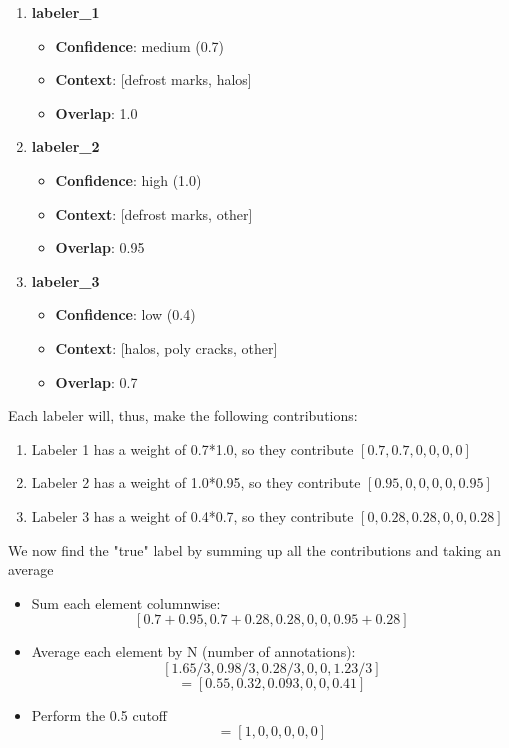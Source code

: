 \documentclass[11pt]{article}
\begin{document}
\begin{enumerate}
    \item \textbf{labeler\_1}
    \begin{itemize}
        \item \textbf{Confidence}: medium (0.7)
        \item \textbf{Context}: [defrost marks, halos]
        \item \textbf{Overlap}: 1.0
    \end{itemize}
    \item \textbf{labeler\_2}
    \begin{itemize}
        \item \textbf{Confidence}: high (1.0)
        \item \textbf{Context}: [defrost marks, other]
        \item \textbf{Overlap}: 0.95
    \end{itemize}
    \item \textbf{labeler\_3}
    \begin{itemize}
        \item \textbf{Confidence}: low (0.4)
        \item \textbf{Context}: [halos, poly cracks, other]
        \item \textbf{Overlap}: 0.7
    \end{itemize}
\end{enumerate}
Each labeler will, thus, make the following contributions:
\begin{enumerate}
    \item Labeler 1 has a weight of 0.7*1.0, so they contribute $[0.7, 0.7, 0, 0, 0, 0]$
    \item Labeler 2 has a weight of 1.0*0.95, so they contribute $[0.95, 0, 0, 0, 0, 0.95]$
    \item Labeler 3 has a weight of 0.4*0.7, so they contribute $[0, 0.28, 0.28, 0, 0, 0.28]$
\end{enumerate}
We now find the "true" label by summing up all the contributions and taking an average
\begin{itemize}
    \item Sum each element columnwise:
    $$[0.7+0.95, 0.7+0.28, 0.28, 0, 0, 0.95+0.28]$$
    \item Average each element by N (number of annotations):
    $$[1.65/3, 0.98/3, 0.28/3, 0, 0, 1.23/3]$$
    $$=[0.55, 0.32, 0.093, 0, 0, 0.41]$$
    \item Perform the 0.5 cutoff
    $$=[1, 0, 0, 0, 0, 0]$$
\end{itemize}
\end{document}
